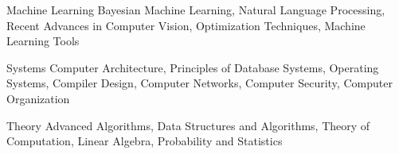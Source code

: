 

\begin{cvskills}

  \cvskill
    {Machine Learning} %
    {Bayesian Machine Learning, Natural Language Processing, Recent Advances in Computer Vision, Optimization Techniques, Machine Learning Tools} %

  \cvskill
    {Systems} %
    {Computer Architecture, Principles of Database Systems, Operating Systems, Compiler Design, Computer Networks, Computer Security, Computer Organization} %

  \cvskill
    {Theory} %
    {Advanced Algorithms, Data Structures and Algorithms, Theory of Computation, Linear Algebra, Probability and Statistics} %
	

\end{cvskills}
